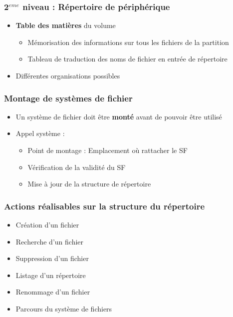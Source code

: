 \begin{frame}
\frametitle{2$^{eme}$ niveau : Répertoire de périphérique}
\begin{itemize}
\item \textbf{Table des matières} du volume
\begin{itemize}
\item Mémorisation des informations sur tous les fichiers de la partition
\item Tableau de traduction des noms de fichier en entrée de répertoire
\end{itemize}
\item Différentes organisations possibles
\end{itemize}
\end{frame}

\begin{frame}
\frametitle{Montage de systèmes de fichier}
\begin{itemize}
\item Un système de fichier doit être \textbf{monté} avant de pouvoir être utilisé
\item Appel système :
\begin{itemize}
\item Point de montage : Emplacement où rattacher le SF
\item Vérification de la validité du SF
\item Mise à jour de la structure de répertoire
\end{itemize}
\end{itemize}
\end{frame}

\begin{frame}
\frametitle{Actions réalisables sur la structure du répertoire}
\begin{itemize}
\item Création d'un fichier
\item Recherche d'un fichier
\item Suppression d'un fichier
\item Listage d'un répertoire
\item Renommage d'un fichier
\item Parcours du système de fichiers
\end{itemize}
\end{frame}

